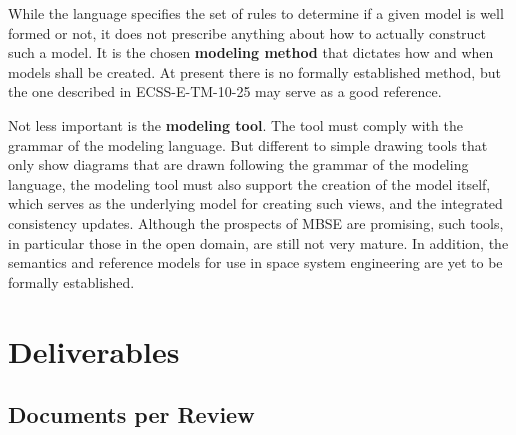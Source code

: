 While the language specifies the set of rules to determine if a given model is well formed or not, it does not prescribe anything about how to actually construct such a model. It is the chosen \textbf{modeling method} that dictates how and when models shall be created. At present there is no formally established method, but the one described in ECSS-E-TM-10-25 \cite{ECSS-E-TM-10-25} may serve as a good reference.

Not less important is the \textbf{modeling tool}. The tool must comply with the grammar of the modeling language. But different to simple drawing tools that only show diagrams that are drawn following the grammar of the modeling language, the modeling tool must also support the creation of the model itself, which serves as the underlying model for creating such views, and the integrated consistency updates. Although the prospects of MBSE are promising, such tools, in particular those in the open domain, are still not very mature. In addition, the semantics and reference models for use in space system engineering are yet to be formally established.

\clearpage
\section{Deliverables}
\label{sec:Engineering Deliverables}

\subsection{Documents per Review}


